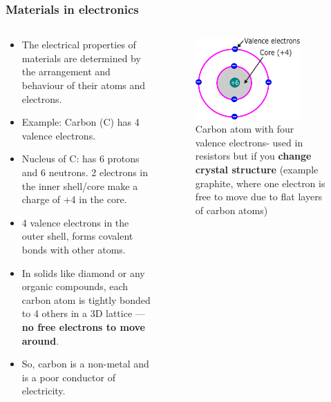 \begin{frame}
	\frametitle{Materials in electronics}
	\begin{columns}
		\begin{column}{0.6\textwidth}
            \begin{itemize}
                \item The electrical properties of materials are determined by the arrangement and behaviour of their atoms and electrons.
                \item Example: Carbon (C) has 4 valence electrons.
                \item Nucleus of C: has 6 protons and 6 neutrons. 2 electrons in the inner shell/core make a charge of +4 in the core.
                \item 4 valence electrons in the outer shell, forms covalent bonds with other atoms. 
                \item In solids like diamond or any organic compounds, each carbon atom is tightly bonded to 4 others in a 3D lattice — \textbf{no free electrons to move around}.
                \item So, carbon is a non-metal and is a poor conductor of electricity. 
            \end{itemize}
		\end{column}
        \hfill
		\begin{column}{0.4\textwidth}
            \begin{figure}
                \centering
                \includegraphics[width=0.8\textwidth]{fig/lec02/carbon_atom.pdf}
                \caption{Carbon atom with four valence electrons- used in resistors but if you \textbf{change crystal structure} (example graphite, where one electron is free to move due to flat layers of carbon atoms)}
            \end{figure}
		\end{column}
		\end{columns}
\end{frame}

